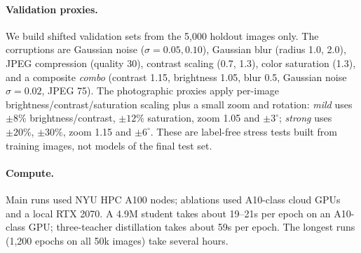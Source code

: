 \paragraph{Validation proxies.}
We build shifted validation sets from the 5,000 holdout images only. The
corruptions are Gaussian noise ($\sigma=0.05,0.10$), Gaussian blur (radius 1.0,
2.0), JPEG compression (quality 30), contrast scaling (0.7, 1.3), color
saturation (1.3), and a composite \emph{combo} (contrast 1.15, brightness 1.05,
blur 0.5, Gaussian noise $\sigma=0.02$, JPEG 75). The photographic proxies apply
per-image brightness/contrast/saturation scaling plus a small zoom and rotation:
\emph{mild} uses $\pm8\%$ brightness/contrast, $\pm12\%$ saturation, zoom 1.05 and
$\pm3^\circ$; \emph{strong} uses $\pm20\%$, $\pm30\%$, zoom 1.15 and $\pm6^\circ$.
These are label-free stress tests built from training images, not models of the
final test set.

\paragraph{Compute.}
Main runs used NYU HPC A100 nodes; ablations used A10-class cloud GPUs and a local
RTX 2070. A 4.9M student takes about 19--21s per epoch on an A10-class GPU;
three-teacher distillation takes about 59s per epoch. The longest runs (1,200
epochs on all 50k images) take several hours.

